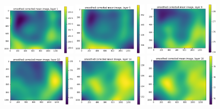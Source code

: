 \documentclass[letterpaper,11pt]{article}
\begin{document}
\begin{figure}[!ht]
\centering
\includegraphics[width=0.32\textwidth]{images/results/smoothed_corrected_mean_image_layers_vectra/smoothed_corrected_mean_image_layer_1}
\includegraphics[width=0.32\textwidth]{images/results/smoothed_corrected_mean_image_layers_vectra/smoothed_corrected_mean_image_layer_5}
\includegraphics[width=0.32\textwidth]{images/results/smoothed_corrected_mean_image_layers_vectra/smoothed_corrected_mean_image_layer_9}
\includegraphics[width=0.32\textwidth]{images/results/smoothed_corrected_mean_image_layers_vectra/smoothed_corrected_mean_image_layer_10}
\includegraphics[width=0.32\textwidth]{images/results/smoothed_corrected_mean_image_layers_vectra/smoothed_corrected_mean_image_layer_14}
\includegraphics[width=0.32\textwidth]{images/results/smoothed_corrected_mean_image_layers_vectra/smoothed_corrected_mean_image_layer_18}

\end{figure}
\end{document}
